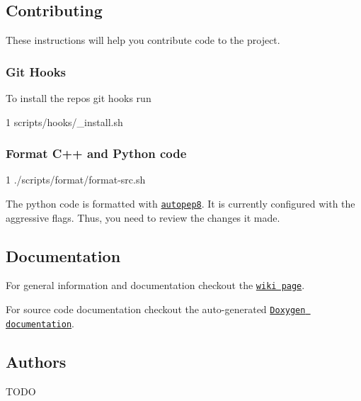 \subsection*{Contributing}

These instructions will help you contribute code to the project.

\subsubsection*{Git Hooks}

To install the repos git hooks run 
\begin{DoxyCode}
1 scripts/hooks/\_install.sh
\end{DoxyCode}


\subsubsection*{Format C++ and Python code}


\begin{DoxyCode}
1 ./scripts/format/format-src.sh
\end{DoxyCode}


The python code is formatted with \href{https://github.com/hhatto/autopep8}{\tt autopep8}. It is currently configured with the aggressive flags. Thus, you need to review the changes it made.

\subsection*{Documentation}


\begin{DoxyItemize}
\item For general information and documentation checkout the \href{https://github.com/Autonomous-Racing-PG/ros.package/wiki}{\tt wiki page}.
\item For source code documentation checkout the auto-\/generated \href{https://autonomous-racing-pg.github.io/ros.package/html/index.html}{\tt Doxygen documentation}.
\end{DoxyItemize}

\subsection*{Authors}


\begin{DoxyItemize}
\item T\+O\+DO
\end{DoxyItemize}

